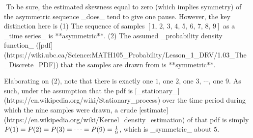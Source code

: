 $\newcommand{\pP}{P}$
To be sure, the estimated skewness equal to zero (which implies symmetry) of the asymmetric sequence _does_ tend to give one pause.
However, the key distinction here is  
(1) The sequence of samples $[1,\,2,\,3,\,4,\,5,\,6,\,7,\,8,\,9]$ as a _time series_ is **asymmetric**.  
(2) The assumed _probability density function_ ([pdf](https://wiki.ubc.ca/Science:MATH105_Probability/Lesson_1_DRV/1.03_The_Discrete_PDF))
that the samples are drawn from is **symmetric**.

Elaborating on (2), note that there is exactly one $1$, one $2$, one $3$, $\cdots$, one $9$.
As such, under the assumption that the pdf is [_stationary_](https://en.wikipedia.org/wiki/Stationary_process)
over the time period during which the nine samples were drawn,
a crude [estimate](https://en.wikipedia.org/wiki/Kernel_density_estimation) of that pdf is simply
$\pP(1)=\pP(2)=\pP(3)=\cdots=\pP(9)=\frac{1}{9}$,
which is _symmetric_ about $5$.
